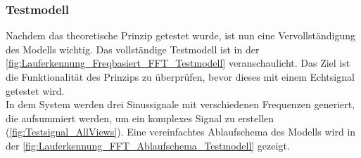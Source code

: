 %

\subsubsection{Testmodell}
Nachdem das theoretische  Prinzip getestet wurde, ist nun eine Vervollständigung des Modells wichtig. Das vollständige Testmodell ist in der \autoref{fig:Lauferkennung_Freqbasiert_FFT_Testmodell} veranschaulicht. Das Ziel ist die Funktionalität des Prinzips zu überprüfen, bevor dieses mit einem Echtsignal getestet wird.\\
In dem System werden drei Sinussignale mit verschiedenen Frequenzen generiert, die aufsummiert werden, um ein komplexes Signal zu erstellen (\autoref{fig:Testsignal_AllViews}).
Eine vereinfachtes Ablaufschema des Modells wird in der \autoref{fig:Lauferkennung_FFT_Ablaufschema_Testmodell} gezeigt.


